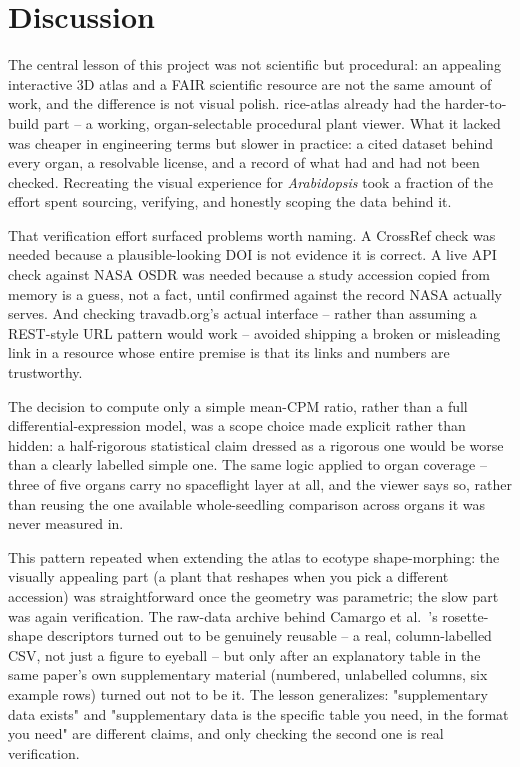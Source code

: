 \section{Discussion}

The central lesson of this project was not scientific but procedural: an appealing
interactive 3D atlas and a FAIR scientific resource are not the same amount of work, and
the difference is not visual polish. rice-atlas already had the harder-to-build part -- a
working, organ-selectable procedural plant viewer. What it lacked was cheaper in
engineering terms but slower in practice: a cited dataset behind every organ, a resolvable
license, and a record of what had and had not been checked. Recreating the visual
experience for \textit{Arabidopsis} took a fraction of the effort spent sourcing,
verifying, and honestly scoping the data behind it.

That verification effort surfaced problems worth naming. A CrossRef check was needed
because a plausible-looking DOI is not evidence it is correct. A live API check against
NASA OSDR was needed because a study accession copied from memory is a guess, not a fact,
until confirmed against the record NASA actually serves. And checking travadb.org's actual
interface -- rather than assuming a REST-style URL pattern would work -- avoided shipping a
broken or misleading link in a resource whose entire premise is that its links and numbers
are trustworthy.

The decision to compute only a simple mean-CPM ratio, rather than a full
differential-expression model, was a scope choice made explicit rather than hidden: a
half-rigorous statistical claim dressed as a rigorous one would be worse than a clearly
labelled simple one. The same logic applied to organ coverage -- three of five organs carry
no spaceflight layer at all, and the viewer says so, rather than reusing the one available
whole-seedling comparison across organs it was never measured in.

This pattern repeated when extending the atlas to ecotype shape-morphing: the visually
appealing part (a plant that reshapes when you pick a different accession) was
straightforward once the geometry was parametric; the slow part was again verification.
The raw-data archive behind Camargo et al.\ \citeyearpar{Camargo2014}'s rosette-shape
descriptors turned out to be genuinely reusable -- a real, column-labelled CSV, not just a
figure to eyeball -- but only after an explanatory table in the same paper's own
supplementary material (numbered, unlabelled columns, six example rows) turned out not to
be it. The lesson generalizes: "supplementary data exists" and "supplementary data is the
specific table you need, in the format you need" are different claims, and only checking
the second one is real verification.

